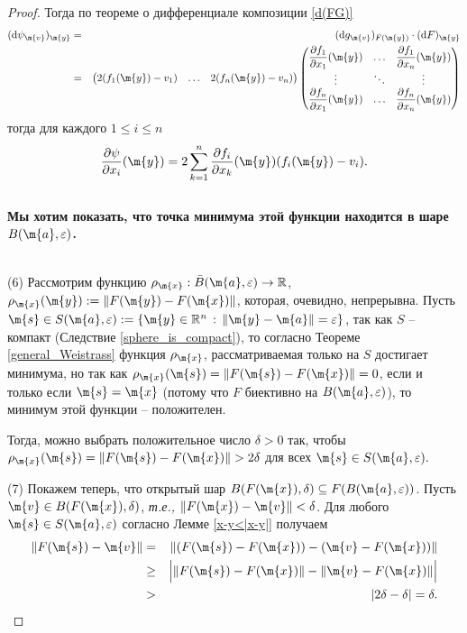 \begin{proof}
Тогда по теореме о дифференциале композиции \ref{d(FG)}
\begin{eqnarray*}
    (\mathrm{d} \psi_\m{v})_\m{y} &=&(\mathrm{d}g_\m{v})_{F(\m{y})} \cdot (\mathrm{d}F)_\m{y} \\
    &=& \begin{pmatrix}
        2(f_1(\m{y}) - v_1) & \ldots & 2(f_n(\m{y}) - v_n) 
    \end{pmatrix} \begin{pmatrix}
     \dfrac{\partial f_1}{\partial x_1}(\m{y}) & \ldots & \dfrac{\partial f_1}{\partial x_n}(\m{y}) \\
     \vdots & \ddots & \vdots \\
     \dfrac{\partial f_n}{\partial x_1}(\m{y}) & \ldots & \dfrac{\partial f_n}{\partial x_n}(\m{y})
     \end{pmatrix} 
\end{eqnarray*}
тогда для каждого $1 \le i \le n$
\begin{equation}\label{d(psi)}
  \dfrac{\partial \psi}{\partial x_i}(\m{y}) = 2 \sum_{k=1}^n \dfrac{\partial f_i}{\partial x_k}(\m{y}) (f_i(\m{y}) - v_i).    
\end{equation}
~\\


 \textbf{Мы хотим показать, что точка минимума этой функции находится в шаре $B(\m{a},\varepsilon)$.}

~\\

(6) Рассмотрим функцию $\rho_\m{x}: \bar B(\m{a},\varepsilon) \to \mathbb{R}$, $\rho_\m{x}(\m{y}): = \| F(\m{y}) - F(\m{x})\|$, которая, очевидно, непрерывна. Пусть $\m{s} \in S(\m{a},\varepsilon): = \{\m{y}\in \mathbb{R}^n\, :\, \| \m{y} - \m{a}\| = \varepsilon\}$, так как $S$ -- компакт (Следствие \ref{sphere_is_compact}), то согласно Теореме \ref{general_Weistrass} функция $\rho_\m{x}$, рассматриваемая только на $S$ достигает минимума, но так как $\rho_\m{x}(\m{s}) = \| F(\m{s}) - F(\m{x})\| = 0$, если и только если $\m{s} = \m{x}$ (потому что $F$ биективно на $B(\m{a},\varepsilon)$), то минимум этой функции -- положителен.

Тогда, можно выбрать положительное число $\delta>0$ так, чтобы $\rho_\m{x}(\m{s}) = \| F(\m{s}) - F(\m{x})\| > 2 \delta$ для всех $\m{s} \in S(\m{a}, \varepsilon).$

(7) Покажем теперь, что открытый шар $B(F(\m{x}), \delta) \subseteq F(B(\m{a}, \varepsilon))$. Пусть $\m{v} \in B(F(\m{x}), \delta)$, \textit{т.е.,} $\| F(\m{x}) - \m{v}\| < \delta$. Для любого $\m{s} \in S(\m{a}, \varepsilon)$ согласно Лемме \ref{x-y<|x-y|} получаем
\begin{eqnarray*}
    \| F(\m{s}) - \m{v}\| &=& \| ( F(\m{s}) - F(\m{x} )) - (\m{v} - F(\m{x}))\| \\
    &\ge & \Bigl|  \| F(\m{s}) - F(\m{x})  \| - \| \m{v} - F(\m{x}) \| \Bigr| \\
    &>& |2\delta - \delta| = \delta.
\end{eqnarray*}


\end{proof}
